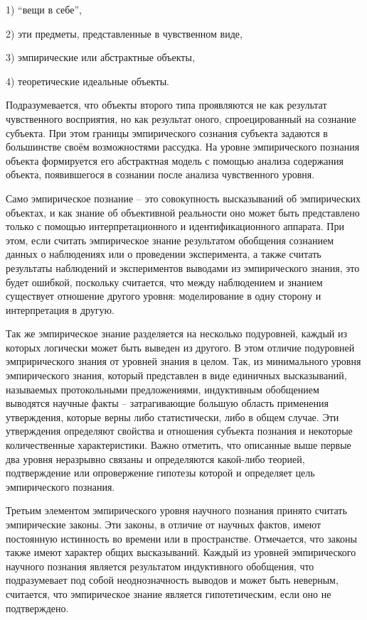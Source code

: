 \documentclass[14pt]{article}
\begin{document}
  1) ``вещи в себе'',   
  
  2) эти предметы, представленные в чувственном виде, 
    
  3) эмпирические или абстрактные объекты,  
  
  4) теоретические идеальные объекты. 
  
  Подразумевается, что объекты второго типа проявляются не как результат чувственного восприятия, но как результат оного, спроецированный на сознание субъекта. При этом границы эмпирического сознания субъекта задаются в большинстве своём возможностями рассудка. На уровне эмпирического познания объекта формируется его абстрактная модель с помощью анализа содержания объекта, появившегося в сознании после анализа чувственного уровня.

Само эмпирическое познание -- это совокупность высказываний об эмпирических объектах, и как знание об объективной реальности оно может быть представлено только с помощью интерпретационного и идентификационного аппарата.  При этом, если считать эмпирическое знание результатом обобщения сознанием данных о наблюдениях или о проведении эксперимента, а также считать результаты наблюдений и экспериментов выводами из эмпирического знания, это будет ошибкой, поскольку считается, что между наблюдением и знанием существует отношение другого уровня: моделирование в одну сторону и интерпретация в другую.

Так же эмпирическое знание разделяется на несколько подуровней, каждый из которых логически может быть выведен из другого. В этом отличие подуровней эмприрического знания от уровней знания в целом. Так, из минимального уровня эмпирического знания, который представлен в виде единичных высказываний, называемых протокольными предложениями, индуктивным обобщением выводятся научные факты -- затрагивающие большую область применения утверждения, которые верны либо статистически, либо в общем случае. Эти утверждения определяют свойства и отношения субъекта познания и некоторые количественные характеристики. Важно отметить, что описанные выше первые два уровня неразрывно связаны и определяются какой-либо теорией, подтверждение или опровержение гипотезы которой и определяет цель эмпирического познания. 

Третьим элементом эмпирического уровня научного познания принято считать эмпирические законы. Эти законы, в отличие от научных фактов, имеют постоянную истинность во времени или в пространстве. Отмечается, что законы также имеют характер общих высказываний. Каждый из уровней эмпирического научного познания является результатом индуктивного обобщения, что подразумевает под собой неоднозначность выводов и может быть неверным, считается, что эмпирическое знание является гипотетическим, если оно не подтверждено.
\end{document}
